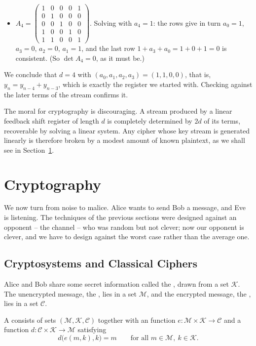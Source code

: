 \documentclass[a4paper]{scrartcl}
\newcommand{\Cc}{\mathcal{C}}
\newcommand{\Kc}{\mathcal{K}}
\newcommand{\Mc}{\mathcal{M}}
\begin{document}
\begin{example}
\begin{itemize}
		\item $A_4 = \begin{pmatrix}1&0&0&0&1\\0&1&0&0&0\\0&0&1&0&0\\1&0&0&1&0\\1&1&0&0&1\end{pmatrix}$. Solving with $a_4=1$: the rows give in turn $a_0 = 1$, $a_3 = 0$, $a_2 = 0$, $a_1 = 1$, and the last row $1+a_3+a_0 = 1+0+1 = 0$ is consistent. (So $\det A_4 = 0$, as it must be.)
	\end{itemize}
	We conclude that $d = 4$ with $(a_0,a_1,a_2,a_3) = (1,1,0,0)$, that is, $y_n = y_{n-4}+y_{n-3}$, which is exactly the register we started with. Checking against the later terms of the stream confirms it.
\end{example}

\begin{remark}
	The moral for cryptography is discouraging. A stream produced by a linear feedback shift register of length $d$ is completely determined by $2d$ of its terms, recoverable by solving a linear system. Any cipher whose key stream is generated linearly is therefore broken by a modest amount of known plaintext, as we shall see in Section~\ref{sec:crypto}.
\end{remark}


\section{Cryptography}\label{sec:crypto}

We now turn from noise to malice. Alice wants to send Bob a message, and Eve is listening. The techniques of the previous sections were designed against an opponent -- the channel -- who was random but not clever; now our opponent is clever, and we have to design against the worst case rather than the average one.

\subsection{Cryptosystems and Classical Ciphers}

Alice and Bob share some secret information called the , drawn from a set $\Kc$. The unencrypted message, the , lies in a set $\Mc$, and the encrypted message, the , lies in a set $\Cc$.

\begin{definition}[Cryptosystem]
	A  consists of sets $(\Mc,\Kc,\Cc)$ together with an  function $e\colon\Mc\times\Kc\to\Cc$ and a  function $d\colon\Cc\times\Kc\to\Mc$ satisfying
	$$d\bigl(e(m,k),k\bigr) = m \qquad \text{for all } m \in \Mc,\ k \in \Kc.$$
\end{definition}
\end{document}
